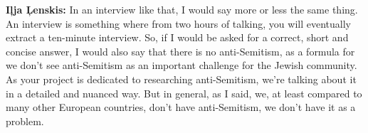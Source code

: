 \textbf{Iļja Ļenskis:} In an interview like that, I would say more or less the same thing. An interview is something where from two hours of talking, you will eventually extract a ten-minute interview. So, if I would be asked for a correct, short and concise answer, I would also say that there is no anti-Semitism, as a formula for we don’t see anti-Semitism as an important challenge for the Jewish community. As your project is dedicated to researching anti-Semitism, we’re talking about it in a detailed and nuanced way. But in general, as I said, we, at least compared to many other European countries, don’t have anti-Semitism, we don’t have it as a problem.
